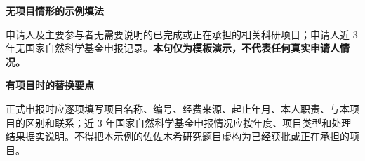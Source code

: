 \GXNSFBodyText

\noindent\textbf{无项目情形的示例填法}\par
申请人及主要参与者无需要说明的已完成或正在承担的相关科研项目；申请人近 3 年无国家自然科学基金申报记录。\textbf{本句仅为模板演示，不代表任何真实申请人情况。}

\noindent\textbf{有项目时的替换要点}\par
正式申报时应逐项填写项目名称、编号、经费来源、起止年月、本人职责、与本项目的区别和联系；近 3 年国家自然科学基金申报情况应按年度、项目类型和处理结果据实说明。不得把本示例的佐佐木希研究题目虚构为已经获批或正在承担的项目。
